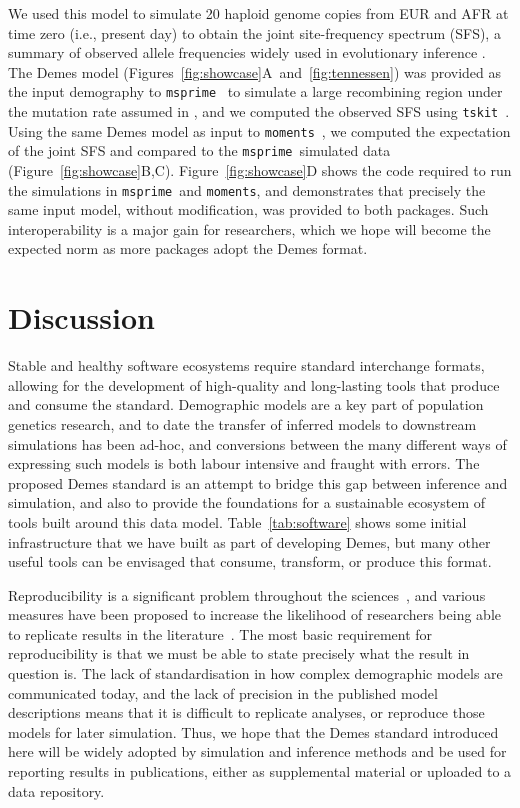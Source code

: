 \documentclass[11pt]{article}
\newcommand{\msprime}[0]{\texttt{msprime}}
\newcommand{\moments}[0]{\texttt{moments}}
\newcommand{\tskit}[0]{\texttt{tskit}}
\begin{document}
We used this model to simulate 20 haploid genome copies from EUR and AFR
at time zero (i.e., present day) to obtain the joint site-frequency spectrum
(SFS), a summary of observed allele frequencies widely used in evolutionary
inference
\citep{bustamante2001directional,gutenkunst2009inferring,tennessen2012evolution,
jouganous2017inferring,kamm2017efficient,kim2017inference}.
The Demes model (Figures~\ref{fig:showcase}A~and~\ref{fig:tennessen}) was
provided as the input demography to \msprime\ \citep{baumdicker2021-iu} to
simulate a large recombining region under the mutation rate assumed in
\citet{tennessen2012evolution}, and we computed the observed SFS using \tskit\
\citep{ralph2020efficiently}. Using the same Demes model as input to \moments\
\citep{jouganous2017inferring}, we computed the expectation of the joint SFS
and compared to the \msprime\ simulated data (Figure~\ref{fig:showcase}B,C).
Figure~\ref{fig:showcase}D shows the code required to run the
simulations in \msprime\ and \moments, and demonstrates that
precisely the same input model, without modification, was provided to both packages.
Such interoperability is a major gain for researchers, which we
hope will become the expected norm as more packages adopt the Demes
format.

\section*{Discussion}
Stable and healthy software ecosystems require standard interchange
formats, allowing for the development of high-quality and long-lasting
tools that produce and consume the standard.
Demographic models are a key part of population genetics research,
and to date the transfer of inferred models to downstream simulations
has been ad-hoc, and conversions between the many different ways
of expressing such models is both labour intensive and fraught with errors.
The proposed Demes standard is an attempt to bridge this gap
between inference and simulation, and also to provide the foundations
for a sustainable ecosystem of tools built around this data model.
Table~\ref{tab:software} shows some initial infrastructure that we have
built as part of developing Demes, but many other useful tools
can be envisaged that consume, transform, or produce this format.

Reproducibility is a significant problem throughout the
sciences~\citep{baker20161}, and various measures have been
proposed to increase the likelihood of researchers being
able to replicate results in the
literature~\citep{munafo2017manifesto}. The most basic requirement
for reproducibility is that we must be able to state precisely what
the result in question is. The lack of standardisation in how
complex demographic models are communicated today, and the lack of
precision in the published model descriptions means that it is difficult
to replicate analyses, or reproduce those models for later simulation.
Thus, we hope that the Demes standard introduced here will be widely adopted
by simulation and inference methods and be used for reporting results in
publications, either as supplemental material or uploaded to a data repository.
\end{document}
